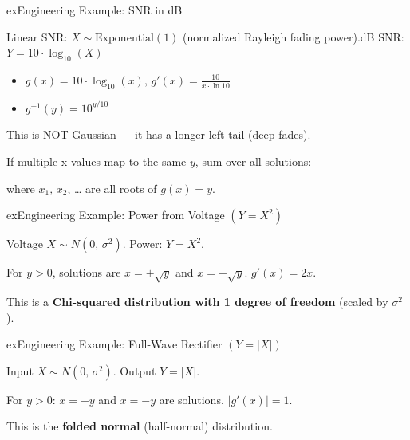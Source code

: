 \begin{PSbox}[unbreakable]{ex}{Engineering Example: SNR in dB}

Linear SNR: $X \sim \mathrm{Exponential}(1)$ (normalized Rayleigh fading power).\PSbr{}dB SNR: $Y = 10 \cdot \log_{10}(X)$

\begin{itemize}
\tightlist
\item
  $\displaystyle g(x) = 10 \cdot \log_{10}(x),\, g'(x) = \frac{10}{x \cdot \ln 10}$
\item
  $g^{-1}(y) = 10^{y/10}$
\end{itemize}


This is NOT Gaussian — it has a longer left tail (deep fades).

\end{PSbox}



If multiple x-values map to the same $y$, sum over all solutions:


where $x_{1},\, x_{2}$, … are all roots of $g(x) = y$.

\begin{PSbox}[unbreakable]{ex}{Engineering Example: Power from Voltage $(Y = X^{2})$}

Voltage $X \sim N(0,\, \sigma^{2})$. Power: $Y = X^{2}$.

For $y > 0$, solutions are $x = +\sqrt{y}$ and $x = -\sqrt{y}$. $g'(x) = 2x$.


This is a \textbf{Chi-squared distribution with 1 degree of freedom} (scaled by $\sigma^{2}$).

\end{PSbox}

\begin{PSbox}[unbreakable]{ex}{Engineering Example: Full-Wave Rectifier $(Y = \lvert X\rvert)$}

Input $X \sim N(0,\, \sigma^{2})$. Output $Y = \lvert X\rvert$.

For $y > 0$: $x = +y$ and $x = -y$ are solutions. $\lvert g'(x)\rvert = 1$.


This is the \textbf{folded normal} (half-normal) distribution.

\end{PSbox}

